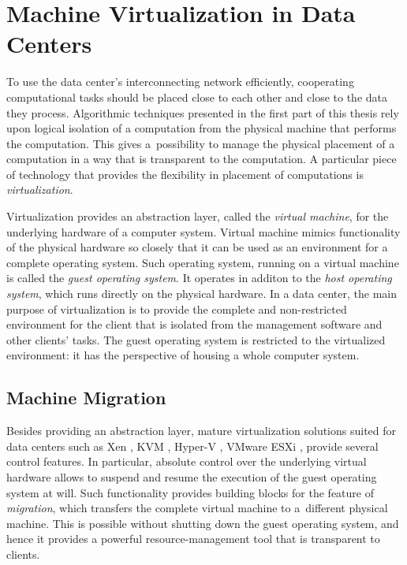 \section{Machine Virtualization in Data Centers}
\label{sec:intro-machine-virtualization}

To use the data center's interconnecting network efficiently, cooperating computational tasks should be placed close to each other and close to the data they process.
Algorithmic techniques presented in the first part of this thesis rely upon logical isolation of a computation from the physical machine that performs the computation.
This gives a~possibility to manage the physical placement of a computation in a way that is transparent to the computation.
A particular piece of technology that provides the flexibility in placement of computations is \emph{virtualization}.

Virtualization provides an abstraction layer, called the \emph{virtual machine}, for the underlying hardware of a computer system.
Virtual machine mimics functionality of the physical hardware so closely that it can be used as an environment for a complete operating system.
Such operating system, running on a virtual machine is called the \emph{guest
operating system}. It operates in additon to the \emph{host operating
system}, which runs directly on the physical hardware. 
In a data center, the main purpose of virtualization is to provide the complete and non-restricted environment for the client that is isolated from the management software and other clients' tasks.
The guest operating system is restricted to the virtualized environment: it has the perspective of housing a whole computer system.


\subsection{Machine Migration}

Besides providing an abstraction layer, mature virtualization solutions suited for data centers such as Xen
\cite{url-xen}, KVM \cite{url-kvm}, Hyper-V \cite{url-hyperv}, VMware ESXi
\cite{url-vmware}, provide several control features.
In particular, absolute control over the underlying virtual hardware allows to suspend and resume the execution of the guest operating system at will.
Such functionality provides building blocks for the feature of \emph{migration}, which transfers the complete virtual machine to a~different physical machine.
This is possible without shutting down the guest operating system, and hence it provides a powerful resource-management tool that is transparent to clients.

